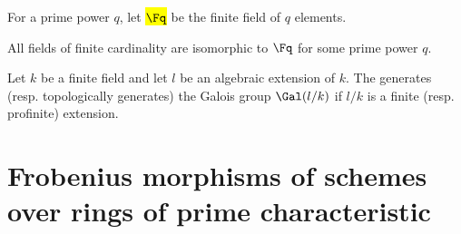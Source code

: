 \begin{notation}
    For a prime power $q$, let \hl{$\Fq$} be the finite field of $q$ elements.
\end{notation}

\begin{claim}
    All fields of finite cardinality are isomorphic to $\Fq$ for some prime power $q$. 
\end{claim}




\begin{claim}
    Let $k$ be a finite field and let $l$ be an algebraic extension of $k$. The  generates (resp. topologically generates) the Galois group $\Gal(l/k)$ if $l/k$ is a finite (resp. profinite) extension.
\end{claim}

\section{Frobenius morphisms of schemes over rings of prime characteristic} \label{section:frobenius_morphisms_of_schemes_wikipedia}

